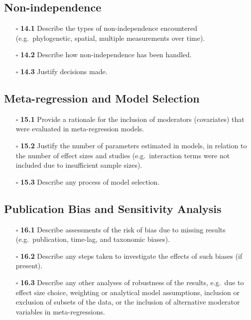 \documentclass[11pt]{article}
\def\tightlist{}
\begin{document}
\begin{Form}
\subsection{Non-independence}\label{non-independence}

\begin{itemize}
\tightlist
\item[$\square$]
  \textbf{14.1} Describe the types of non-independence encountered
  (e.g.~phylogenetic, spatial, multiple measurements over time).
\item[$\square$]
  \textbf{14.2} Describe how non-independence has been handled.
\item[$\square$]
  \textbf{14.3} Justify decisions made.
\end{itemize}

\subsection{Meta-regression and Model
Selection}\label{meta-regression-and-model-selection}

\begin{itemize}
\tightlist
\item[$\square$]
  \textbf{15.1} Provide a rationale for the inclusion of moderators
  (covariates) that were evaluated in meta-regression models.
\item[$\square$]
  \textbf{15.2} Justify the number of parameters estimated in models, in
  relation to the number of effect sizes and studies (e.g.~interaction
  terms were not included due to insufficient sample sizes).
\item[$\square$]
  \textbf{15.3} Describe any process of model selection.
\end{itemize}

\subsection{Publication Bias and Sensitivity
Analysis}\label{publication-bias-and-sensitivity-analysis}

\begin{itemize}
\tightlist
\item[$\square$]
  \textbf{16.1} Describe assessments of the risk of bias due to missing
  results (e.g.~publication, time-lag, and taxonomic biases).
\item[$\square$]
  \textbf{16.2} Describe any steps taken to investigate the effects of
  such biases (if present).
\item[$\square$]
  \textbf{16.3} Describe any other analyses of robustness of the
  results, e.g.~due to effect size choice, weighting or analytical model
  assumptions, inclusion or exclusion of subsets of the data, or the
  inclusion of alternative moderator variables in meta-regressions.
\end{itemize}


\end{Form}
\end{document}
